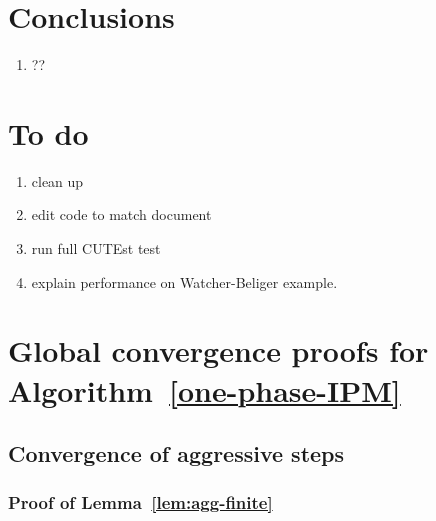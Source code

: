\documentclass{article}
\begin{document}
\section{Conclusions}
\begin{enumerate}
\item ??
\end{enumerate}


\section{To do}

\begin{enumerate}
\item clean up 
\item edit code to match document
\item run full CUTEst test
\item explain performance on Watcher-Beliger example.
\end{enumerate}




\appendix

\section{Global convergence proofs for Algorithm~\ref{one-phase-IPM}}\label{app:global-conv}

\subsection{Convergence of aggressive steps}

\subsubsection{Proof of Lemma~\ref{lem:agg-finite}}\label{sub:lem:agg-finite}

\lemAggFinite*
\end{document}
